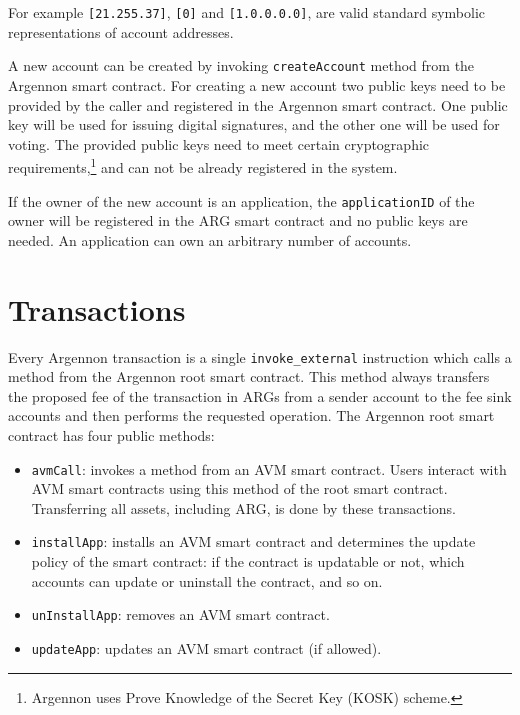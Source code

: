 For example \texttt{[21.255.37]}, \texttt{[0]} and \texttt{[1.0.0.0.0]}, are valid standard symbolic representations
of account addresses.

A new account can be created by invoking \texttt{createAccount} method from the Argennon smart contract. For creating
a new account two public keys need to be provided by the caller and registered in the Argennon smart contract.
One public key will be used for issuing digital signatures, and the other one will be used for voting. The
provided public keys need to meet certain cryptographic requirements,\footnote{Argennon uses Prove
Knowledge of the Secret Key (KOSK) scheme.} and can not be already registered in the system.

If the owner of the new account is an application, the \texttt{applicationID} of the owner will be registered in the
ARG smart contract and no public keys are needed. An application can own an arbitrary number of accounts.


\section{Transactions}\label{sec:transactions}

Every Argennon transaction is a single \texttt{invoke\_external} instruction which calls a method from the Argennon
root smart contract. This method always transfers the proposed fee of the transaction in ARGs from a
sender account to the fee sink accounts and then performs the requested operation. The Argennon root smart contract
has four public methods:

\begin{itemize}
    \item \texttt{avmCall}: invokes a method from an
    AVM smart contract. Users interact with AVM smart contracts using this method of the root smart contract.
    Transferring all assets, including ARG, is done by these transactions.
    \item \texttt{installApp}: installs an AVM smart contract and determines the update policy of the smart
    contract: if the contract is updatable or not, which accounts can update or uninstall the contract, and so
    on.
    \item \texttt{unInstallApp}: removes an AVM smart contract.
    \item \texttt{updateApp}: updates an AVM smart contract (if allowed).
\end{itemize}


